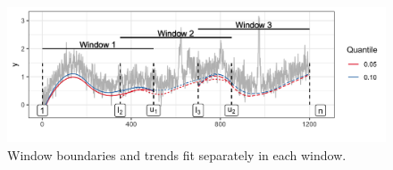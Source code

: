 \documentclass[12pt]{article}
\newcommand{\M}[1]{{\bm{\mathbf{\MakeUppercase{#1}}}}} %
\begin{document}
%
	\begin{figure}[!t]
		\centering
		\includegraphics[width = 0.8\linewidth]{Figures/overlapping_windows.png}
		\caption{Window boundaries and trends fit separately in each window.}
		\label{fig:windows}
	\end{figure}
\end{document}
